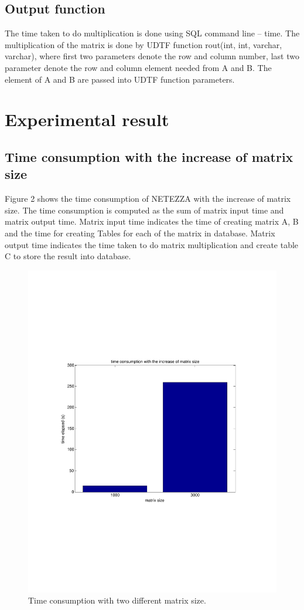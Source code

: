 \documentclass {article}
\begin{document}
\subsection{Output function}
The time taken to do multiplication is done using SQL command line -- time. 
The multiplication of the matrix is done by UDTF function rout(int, int, varchar, varchar), where first two parameters denote the row and column number, last two parameter denote the row and column element needed from A and B. The element of A and B are passed into UDTF function parameters.

\section {Experimental result}
\subsection{Time consumption with the increase of matrix size}
Figure 2 shows the time consumption of NETEZZA with the increase of matrix size. The time consumption is computed as the sum of matrix input time and matrix output time. Matrix input time indicates the time of creating matrix A, B and the time for creating Tables for each of the matrix in database. Matrix output time indicates the time taken to do matrix multiplication and create table C to store the result into database. 

\begin{figure}[htp!]
\centering
\includegraphics[width = \linewidth]{2.pdf}
\caption{Time consumption with two different matrix size.}
\label{fig:two}
\end{figure}
\end{document}
